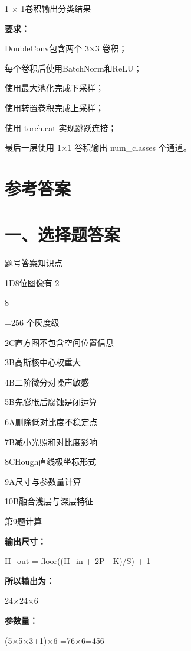 \documentclass[UTF8,openany,oneside,zihao=-4,fontset=windows]{ctexbook}
\newif\ifshowsolutions
\newcommand{\PracticeSpace}[1]{\ifshowsolutions\else\par\vspace{#1}\par\fi}
\begin{document}
\par 1 × 1卷积输出分类结果
\par\noindent\textbf{要求：}
\par\noindent\textbullet\quad DoubleConv包含两个 3×3 卷积；
\par\noindent\textbullet\quad 每个卷积后使用BatchNorm和ReLU；
\par\noindent\textbullet\quad 使用最大池化完成下采样；
\par\noindent\textbullet\quad 使用转置卷积完成上采样；
\par\noindent\textbullet\quad 使用 torch.cat 实现跳跃连接；
\par 最后一层使用 1×1 卷积输出 num\_classes 个通道。
\PracticeSpace{5.5cm}
\ifshowsolutions
\clearpage
\section{参考答案}
\section{一、选择题答案}
\par 题号\quad 答案\quad 知识点
\par 1\quad D\quad 8位图像有 2
\par 8
\par =256 个灰度级
\par 2\quad C\quad 直方图不包含空间位置信息
\par 3\quad B\quad 高斯核中心权重大
\par 4\quad B\quad 二阶微分对噪声敏感
\par 5\quad B\quad 先膨胀后腐蚀是闭运算
\par 6\quad A\quad 删除低对比度不稳定点
\par 7\quad B\quad 减小光照和对比度影响
\par 8\quad C\quad Hough直线极坐标形式
\par 9\quad A\quad 尺寸与参数量计算
\par 10\quad B\quad 融合浅层与深层特征
\par 第9题计算
\par\noindent\textbf{输出尺寸：}
\begin{center}\small\ttfamily H\_out = floor((H\_in + 2P - K)/S) + 1\end{center}
\par\noindent\textbf{所以输出为：}
\par 24×24×6
\par\noindent\textbf{参数量：}
\begin{center}\small\ttfamily (5×5×3+1)×6 =76×6=456\end{center}
\end{document}
